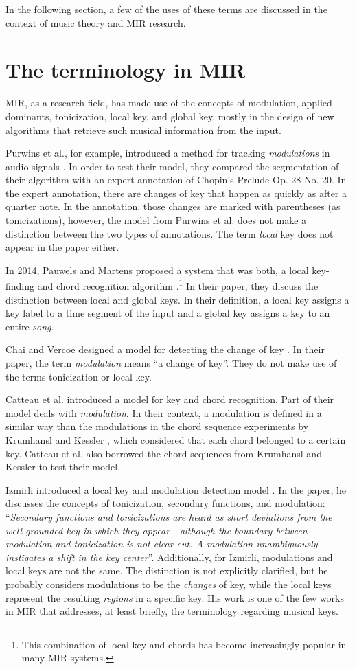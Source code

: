 In the following section, a few of the uses of these terms are discussed in the context of music theory and MIR research.

\section{The terminology in MIR}
MIR, as a research field, has made use of the concepts of modulation, applied dominants, tonicization, local key, and global key, mostly in the design of new algorithms that retrieve such musical information from the input.

Purwins et al., for example, introduced a method for tracking \emph{modulations} in audio signals \cite{purwins2000new}. In order to test their model, they compared the segmentation of their algorithm with an expert annotation of Chopin's Prelude Op. 28 No. 20. In the expert annotation, there are changes of key that happen as quickly as after a quarter note. In the annotation, those changes are marked with parentheses (as tonicizations), however, the model from Purwins et al. does not make a distinction between the two types of annotations. The term \emph{local} key does not appear in the paper either.

In 2014, Pauwels and Martens proposed a system that was both, a local key-finding and chord recognition algorithm \cite{pauwels2014combining}.\footnote{This combination of local key and chords has become increasingly popular in many MIR systems.} In their paper, they discuss the distinction between local and global keys. In their definition, a local key assigns a key label to a time segment of the input and a global key assigns a key to an entire \emph{song}.

Chai and Vercoe designed a model for detecting the change of key \cite{chai2005detection}. In their paper, the term \emph{modulation} means ``a change of key''. They do not make use of the terms tonicization or local key.

Catteau et al. introduced a model for key and chord recognition. Part of their model deals with \emph{modulation}. In their context, a modulation is defined in a similar way than the modulations in the chord sequence experiments by Krumhansl and Kessler \cite{krumhansl1982tracing}, which considered that each chord belonged to a certain key. Catteau et al. also borrowed the chord sequences from Krumhansl and Kessler to test their model.

Izmirli introduced a local key and modulation detection model \cite{izmirli2007localized}. In the paper, he discusses the concepts of tonicization, secondary functions, and modulation: ``\emph{Secondary functions and tonicizations are heard as short deviations from the well-grounded key in which they appear - although the boundary between modulation and tonicization is not clear cut. A modulation unambiguously instigates a shift in the key center}''. Additionally, for Izmirli, modulations and local keys are not the same. The distinction is not explicitly clarified, but he probably considers modulations to be the \emph{changes} of key, while the local keys represent the resulting \emph{regions} in a specific key. His work is one of the few works in MIR that addresses, at least briefly, the terminology regarding musical keys. 

